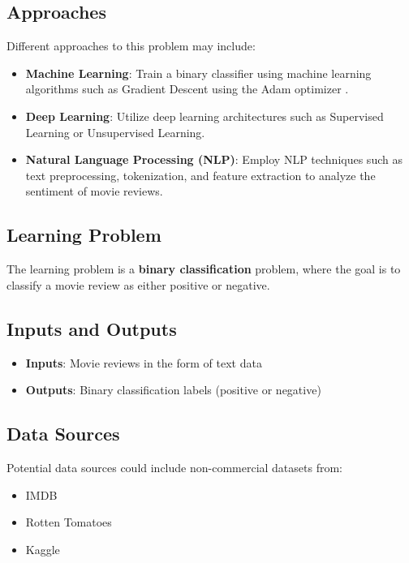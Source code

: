 \documentclass{report}
\begin{document}
\subsection{Approaches}
Different approaches to this problem may include:

\begin{itemize}
    \item \textbf{Machine Learning}: Train a binary classifier using machine learning algorithms such as Gradient Descent using the Adam optimizer \cite{adamOptimizerGFG}.
    \item \textbf{Deep Learning}: Utilize deep learning architectures such as Supervised Learning or Unsupervised Learning.
    \item \textbf{Natural Language Processing (NLP)}: Employ NLP techniques such as text preprocessing, tokenization, and feature extraction to analyze the sentiment of movie reviews.
\end{itemize}

\subsection{Learning Problem}

The learning problem is a \textbf{binary classification} problem, where the goal is to classify a movie review as either positive or negative.

\subsection{Inputs and Outputs}

\begin{itemize}
    \item \textbf{Inputs}: Movie reviews in the form of text data
    \item \textbf{Outputs}: Binary classification labels (positive or negative)
\end{itemize}

\subsection{Data Sources}
Potential data sources could include non-commercial datasets from: 
\begin{itemize}
    \item IMDB
    \item Rotten Tomatoes 
    \item Kaggle
\end{itemize}
\end{document}

